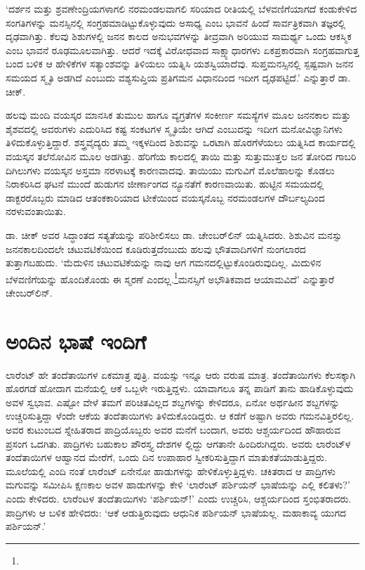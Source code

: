 ‘ದರ್ಶನ ಮತ್ತು ಶ್ರವಣೇಂದ್ರಿಯಗಳಾಗಲಿ ನರಮಂಡಲವಾಗಲಿ ಸರಿಯಾದ ರೀತಿಯಲ್ಲಿ ಬೆಳವಣಿಗೆಯಾಗದೆ ಕಂಡುಕೇಳಿದ ಸಂಗತಿಗಳನ್ನು ಮನಸ್ಸಿನಲ್ಲಿ ಸಂಗ್ರಹಮಾಡಿಟ್ಟುಕೊಳ್ಳುವುದು ಅಸಾಧ್ಯ ಎಂಬ ಭಾವನೆ ಹಿಂದೆ ಸಾರ್ವತ್ರಿಕವಾಗಿ ತಜ್ಞರಲ್ಲಿ ದೃಢವಾಗಿತ್ತು. ಕೆಲವು ಶಿಶುಗಳಲ್ಲಿ ಜನನ ಕಾಲದ ಅನುಭವಗಳನ್ನು ತೀವ್ರವಾಗಿ ಅರಿಯುವ ಸಾಮರ್ಥ್ಯ ಒಂದು ಆಕಸ್ಮಿಕ ಎಂಬ ಭಾವನೆ ರೂಢಮೂಲವಾಗಿತ್ತು. ಆದರೆ ಇದಕ್ಕೆ ವಿರೋಧವಾದ ಸಾಕ್ಷ್ಯಾಧಾರಗಳು ಏಕಪ್ರಕಾರವಾಗಿ ಸಂಗ್ರಹವಾಗುತ್ತ ಬಂದ ಬಳಿಕ ಆ ಹೇಳಿಕೆಗಳ ಸತ್ಯಾಂಶವನ್ನು ತಿಳಿಯಲು ಯತ್ನಿಸಿ ಯಶಸ್ವಿಯಾದೆವು. ಸುಪ್ತಮನಸ್ಸಿನಲ್ಲಿ ಸ್ಪಷ್ಟವಾಗಿ ಜನನ ಸಮಯದ ಸ್ಮೃತಿ ಅಡಗಿದೆ ಎಂಬುದು ವಶ್ಯಸುಪ್ತಿಯ ಪ್ರತಿಗಮನ ವಿಧಾನದಿಂದ ಇದೀಗ ದೃಢಪಟ್ಟಿದೆ.’ ಎನ್ನುತ್ತಾರೆ ಡಾ. ಚೀಕ್.

ಹಲವು ಮಂದಿ ವಯಸ್ಕರ ಮಾನಸಿಕ ತುಮುಲ ಹಾಗೂ ವ್ಯಗ್ರತೆಗಳ ಸಂಕೀರ್ಣ ಸಮಸ್ಯೆಗಳ ಮೂಲ ಜನನಕಾಲ ಮತ್ತು ಶೈಶವದಲ್ಲಿ ಅವರುಗಳು ಎದುರಿಸಿದ ಕಷ್ಟ ಸಂಕಟಗಳ ಸ್ಮೃತಿಯೇ ಆಗಿದೆ ಎಂಬುದನ್ನು ಇದೀಗ ಮನೋವಿಜ್ಞಾನಿಗಳು ತಿಳಿದುಕೊಳ್ಳುತ್ತಿದ್ದಾರೆ. ಶಸ್ತ್ರವೈದ್ಯರು ತಮ್ಮ ಇಕ್ಕಳದಿಂದ ಶಿಶುವನ್ನು ಒರಟಾಗಿ ಹೊರಗೆಳೆಯಲು ಯತ್ನಿಸಿದ ಕಾರ್ಯದಲ್ಲಿ ವಯಸ್ಕನ ತಲೆನೋವಿನ ಮೂಲ ಅಡಗಿತ್ತು. ಹೆರಿಗೆಯ ಕಾಲದಲ್ಲಿ ತಾಯಿ ಮತ್ತು ಸುತ್ತುಮುತ್ತಲ ಜನ ತೋರಿದ ಗಾಬರಿ ದಿಗಿಲುಗಳು ವಯಸ್ಕನ ಅಸ್ತಮಾ ನರಳಾಟಕ್ಕೆ ಕಾರಣವಾದವು. ತಾಯಿಯು ಮಗುವಿಗೆ ಮೊಲೆಹಾಲನ್ನು ಕೊಡಲು ನಿರಾಕರಿಸಿದ ಘಟನೆ ಮುಂದೆ ಹುಡುಗನ ಜೀರ್ಣಾಂಗದ ನ್ಯೂನತೆಗೆ ಕಾರಣವಾಯಿತು. ಹುಟ್ಟಿನ ಸಮಯದಲ್ಲಿ ಡಾಕ್ಟರರೊಬ್ಬರು ಮಾಡಿದ ಆತಂಕಕಾರಿಯಾದ ಟೀಕೆಯಿಂದ ವಯಸ್ಕನೊಬ್ಬ ನರಮಂಡಲಗಳ ದೌರ್ಬಲ್ಯದಿಂದ ನರಳುವಂತಾಯಿತು.

ಡಾ. ಚೀಕ್ ಅವರ ಸಿದ್ಧಾಂತದ ಸತ್ಯತೆಯನ್ನು ಪರಿಶೀಲಿಸಲು ಡಾ. ಚೇಂಬರ್​ಲಿನ್ ಯತ್ನಿಸಿದರು. ಶಿಶುವಿನ ಮನಸ್ಸು ಜನನಕಾಲದಿಂದಲೇ ಚಟುವಟಿಕೆಯಿಂದ ಕೂಡಿರುತ್ತದೆಂಬುದು ಹಲವು ಭೌತವಾದಿಗಳಿಗೆ ನುಂಗಲಾರದ ತುತ್ತಾಗಬಹುದು. ‘ಮೆದುಳಿನ ಚಟುವಟಿಕೆಯನ್ನು ನಾವು ಆಗ ಗಮನದಲ್ಲಿಟ್ಟುಕೊಂಡಿರುವುದಿಲ್ಲ. ಮಿದುಳಿನ ಬೆಳವಣಿಗೆಯನ್ನು ಹೊಂದಿಕೊಂಡು ಈ ಸ್ಮರಣೆ ಎಂದಲ್ಲ.\footnote{\hfill{}}ಮನಸ್ಸಿಗೆ ಅಭೌತಿಕವಾದ ಆಯಾಮವಿದೆ’ ಎನ್ನುತ್ತಾರೆ ಚೇಂಬರ್​ಲಿನ್.


\section{ಅಂದಿನ ಭಾಷೆ ಇಂದಿಗೆ}

ಲಾರೆಂಟ್ ಹೇ ತಂದೆತಾಯಿಗಳ ಏಕಮಾತ್ರ ಪುತ್ರಿ. ವಯಸ್ಸು ಇನ್ನೂ ಆರು ವರುಷ ಮಾತ್ರ. ತಂದೆತಾಯಿಗಳು ಕೆಲಸಕ್ಕಾಗಿ ಹೊರಗಡೆ ಹೋದಾಗ ಮನೆಯಲ್ಲಿ ಆಕೆ ಒಬ್ಬಳೇ ಇರುತ್ತಿದ್ದಳು. ಯಾವಾಗಲೂ ತನ್ನ ಪಾಡಿಗೆ ತಾನು ಹಾಡಿಕೊಳ್ಳುವುದು ಅವಳ ಸ್ವಭಾವ. ಎಷ್ಟೋ ವೇಳೆ ತಮಗೆ ಪರಿಚಿತವಿಲ್ಲದ ಶಬ್ದಗಳನ್ನು ಕೇಳಿದರೂ, ಏನೋ ಅರ್ಥಹೀನ ಶಬ್ದಗಳನ್ನು ಉಚ್ಚರಿಸುತ್ತಿದ್ದಾ ಳೆಂದೇ ಆಕೆಯ ತಂದೆತಾಯಿಗಳು ತಿಳಿದುಕೊಂಡಿದ್ದರು. ಆ ಕಡೆಗೆ ಅಷ್ಟಾಗಿ ಅವರು ಗಮನವಿತ್ತಿರಲಿಲ್ಲ. ಅವರ ಕುಟುಂಬದ ಸ್ನೇಹಿತರಾದ ಪಾದ್ರಿಯೊಬ್ಬರು ಅವರ ಮನೆಗೆ ಬಂದಾಗ, ಅವರು ಆಶ್ಚರ್ಯದಿಂದ ಹೌಹಾರುವ ಪ್ರಸಂಗ ಒದಗಿತು. ಪಾದ್ರಿಗಳು ಬಹುಕಾಲ ಪೌರಸ್ತ್ಯ ದೇಶಗಳ ಲ್ಲಿದ್ದು ಆಗತಾನೇ ಹಿಂದಿರುಗಿದ್ದರು. ಅವರು ಲಾರೆಂಟ್​ಳ ತಂದೆತಾಯಿಗಳ ಆಹ್ವಾನದ ಮೇರೆಗೆ, ಒಂದು ದಿನ ಉಪಾಹಾರ ಸ್ವೀಕರಿಸುತ್ತಿದ್ದಾಗ ಮಾತುಕತೆಯಾಡುತ್ತಿದ್ದರು. ಮೂಲೆಯಲ್ಲಿ ಎಂದಿ ನಂತೆ ಲಾರೆಂಟ್ ಏನೇನೋ ಹಾಡುಗಳನ್ನು ಹೇಳಿಕೊಳ್ಳುತ್ತಿದ್ದಳು. ಚಕಿತರಾದ ಆ ಪಾದ್ರಿಗಳು ಮಗುವನ್ನು ಸಮೀಪಿಸಿ ಕ್ಷಣಕಾಲ ಅವಳ ಹಾಡುಗಳನ್ನು ಕೇಳಿ ‘ಲಾರೆಂಟ್ ಪರ್ಶಿಯನ್ ಭಾಷೆಯನ್ನು ಎಲ್ಲಿ ಕಲಿತಳು?’ ಎಂದು ಕೇಳಿದರು. ಲಾರೆಂಟಳ ತಂದೆತಾಯಿಗಳು ‘ಪರ್ಶಿಯನ್​!’ ಎಂದು ಉಚ್ಚರಿಸಿ, ಆಶ್ಚರ್ಯದಿಂದ ಸ್ತಂಭಿತರಾದರು. ಪಾದ್ರಿಗಳು ಆ ಬಳಿಕ ಹೇಳಿದರು: ‘ಆಕೆ ಆಡುತ್ತಿರುವುದು ಆಧುನಿಕ ಪರ್ಶಿಯನ್ ಭಾಷೆಯಲ್ಲ. ಮಹಾಕಾವ್ಯ ಯುಗದ ಪರ್ಶಿಯನ್.’

